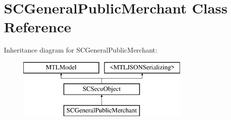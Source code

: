 \hypertarget{interface_s_c_general_public_merchant}{}\section{S\+C\+General\+Public\+Merchant Class Reference}
\label{interface_s_c_general_public_merchant}
Inheritance diagram for S\+C\+General\+Public\+Merchant\+:\begin{figure}[H]
\begin{center}
\leavevmode
\includegraphics[height=3.000000cm]{interface_s_c_general_public_merchant}
\end{center}
\end{figure}
